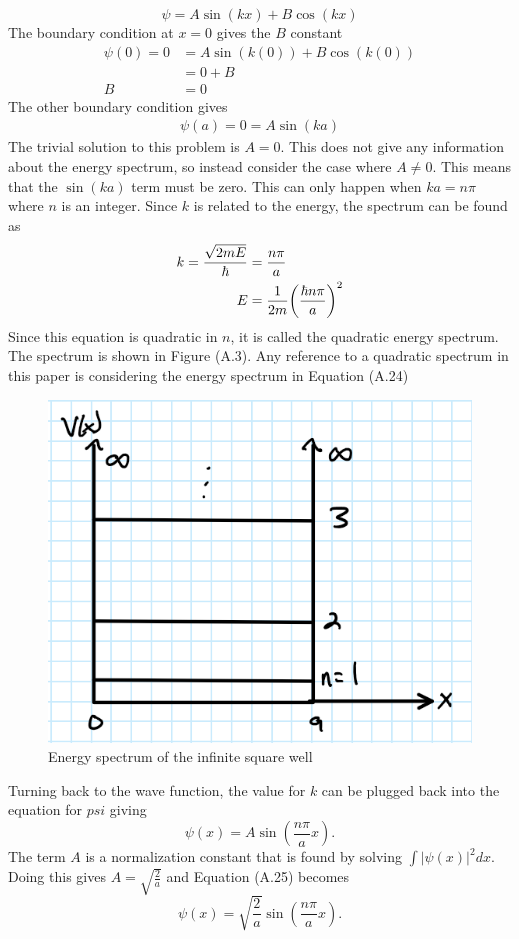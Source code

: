\begin{equation}
    \psi=A\sin(kx)+B\cos(kx)
\end{equation}
The boundary condition at $x=0$ gives the $B$ constant 
\begin{align}
    \psi(0)=0&=A\sin(k(0))+B\cos(k(0))\\
    &=0+B\\
    B&=0
\end{align}
The other boundary condition gives
\begin{align}
    \psi(a)=0=A\sin(ka)
\end{align}
The trivial solution to this problem is $A=0$. This does not give any information about the energy spectrum, so instead consider the case where $A\neq 0$. This means that the $\sin(ka)$ term must be zero. This can only happen when $ka=n\pi$ where $n$ is an integer. Since $k$ is related to the energy, the spectrum can be found as
\begin{align}
    k=\frac{\sqrt{2mE}}{\hbar}&=\frac{n\pi}{a}\\
    E&=\frac{1}{2m} \qty(\frac{\hbar n\pi}{a})^2 
\end{align}
Since this equation is quadratic in $n$, it is called the quadratic energy spectrum. The spectrum is shown in Figure (A.3). Any reference to a quadratic spectrum in this paper is considering the energy spectrum in Equation (A.24)
\begin{figure}
    \centering
    \includegraphics[scale=0.5]{figures/pdf/infsqspec.PNG}
    \caption{Energy spectrum of the infinite square well}
    \label{fig:Energy spectrum of the infinite square well}
\end{figure}
Turning back to the wave function, the value for $k$ can be plugged back into the equation for $psi$ giving
\begin{equation}
    \psi(x)=A\sin(\frac{n\pi}{a}x).
\end{equation}
The term $A$ is a normalization constant that is found by solving $\int|\psi(x)|^2 dx$. Doing this gives $A=\sqrt{\frac{2}{a}}$ and Equation (A.25) becomes 
\begin{equation}
    \psi(x)=\sqrt{\frac{2}{a}}\sin(\frac{n\pi}{a}x).
\end{equation}